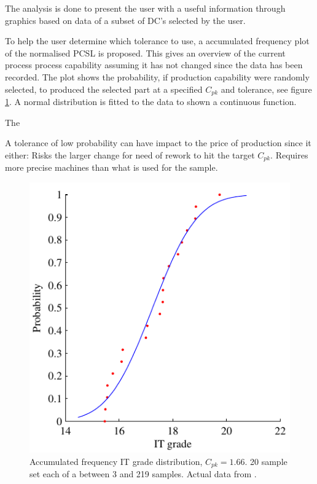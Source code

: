 \documentclass[aip,amsmath, reprint, author-year]{revtex4-1}
\begin{document}
The analysis is done to present the user with a useful information through graphics based on data of  a subset of DC's selected by the user. 

To help the user determine which tolerance to use, a accumulated frequency plot of the normalised PCSL is proposed. 
This gives an overview of the current process process capability assuming it has not changed since the data has been recorded. 
The plot shows the probability, if production capability were randomly selected, to produced the selected part at a specified $C_{pk}$ and tolerance, see figure \ref{fig:acumfreq}. 
A normal distribution is fitted to the data to shown a continuous function.

The 



A tolerance of low probability can have impact to the price of production since it either: Risks the larger change for need of rework to hit the target $C_{pk}$. Requires more precise machines than what is used for the sample.

\begin{figure}
\includegraphics{Acum_freqIT.pdf}
\caption{\label{fig:acumfreq} Accumulated frequency IT grade distribution, $C_{pk} =1.66$. 
20 sample set each of a between 3 and 219 samples. Actual data from \cite{thornton2000use}. }
\end{figure}
\end{document}
